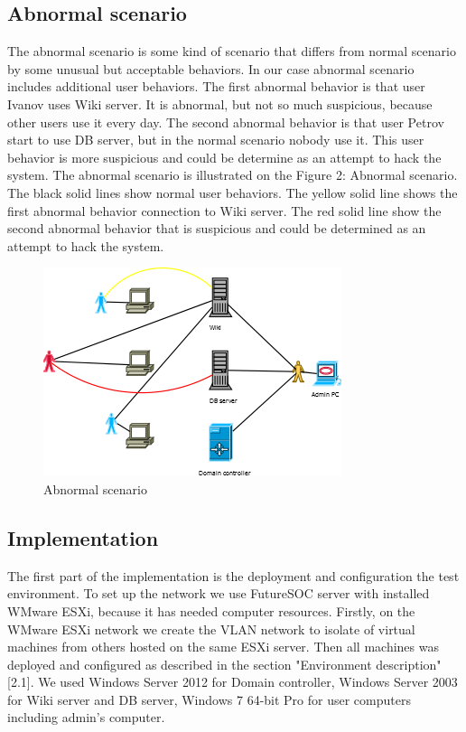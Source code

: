 \subsection{Abnormal scenario}
The abnormal scenario is some kind of scenario that differs from normal scenario by some unusual but acceptable behaviors. In our case abnormal scenario includes additional user behaviors. The first abnormal behavior is that user Ivanov uses Wiki server. It is abnormal, but not so much suspicious, because other users use it every day. The second abnormal behavior is that user Petrov start to use DB server, but in the normal scenario nobody use it. This user  behavior is more suspicious and could be determine as an attempt to hack the system. The abnormal scenario is illustrated on the Figure 2: Abnormal scenario. The black solid lines show normal user behaviors. The yellow solid line shows the first abnormal behavior connection to Wiki server. The red solid line show the second abnormal behavior that is suspicious and could be determined as an attempt to hack the system. 
\begin{figure}[ht!]
\centering
\includegraphics{scenario_abnormal.png}
\caption{Abnormal scenario}
\label{overflow}
\end{figure}

\subsection{Implementation}
The first part of the implementation is the deployment and configuration the test environment.  To set up the network we use FutureSOC server with installed WMware ESXi, because it has needed computer resources. Firstly, on the WMware ESXi network we create the VLAN network to isolate of virtual machines from others hosted on the same ESXi server. Then all machines was deployed and configured as described in the section "Environment description" [2.1]. We used Windows Server 2012 for Domain controller, Windows Server 2003 for Wiki server and DB server, Windows 7 64-bit Pro for user computers including admin's computer. 

